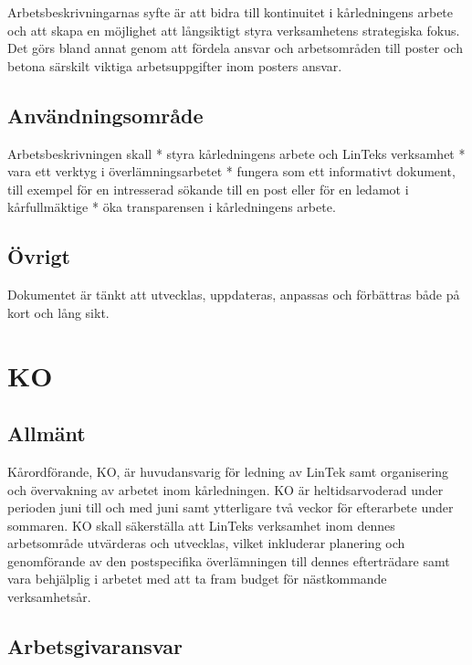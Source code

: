 Arbetsbeskrivningarnas syfte är att bidra till kontinuitet i
kårledningens arbete och att skapa en möjlighet att långsiktigt styra
verksamhetens strategiska fokus. Det görs bland annat genom att fördela
ansvar och arbetsområden till poster och betona särskilt viktiga
arbetsuppgifter inom posters ansvar.

\hypertarget{anvuxe4ndningsomruxe5de}{%
\subsection{Användningsområde}\label{anvuxe4ndningsomruxe5de}}

Arbetsbeskrivningen skall * styra kårledningens arbete och LinTeks
verksamhet * vara ett verktyg i överlämningsarbetet * fungera som ett
informativt dokument, till exempel för en intresserad sökande till en
post eller för en ledamot i kårfullmäktige * öka transparensen i
kårledningens arbete.

\hypertarget{uxf6vrigt}{%
\subsection{Övrigt}\label{uxf6vrigt}}

Dokumentet är tänkt att utvecklas, uppdateras, anpassas och förbättras
både på kort och lång sikt.

\hypertarget{ko}{%
\section{KO}\label{ko}}

\hypertarget{allmuxe4nt}{%
\subsection{Allmänt}\label{allmuxe4nt}}

Kårordförande, KO, är huvudansvarig för ledning av LinTek samt
organisering och övervakning av arbetet inom kårledningen. KO är
heltidsarvoderad under perioden juni till och med juni samt ytterligare
två veckor för efterarbete under sommaren. KO skall säkerställa att
LinTeks verksamhet inom dennes arbetsområde utvärderas och utvecklas,
vilket inkluderar planering och genomförande av den postspecifika
överlämningen till dennes efterträdare samt vara behjälplig i arbetet
med att ta fram budget för nästkommande verksamhetsår.

\hypertarget{arbetsgivaransvar}{%
\subsection{Arbetsgivaransvar}\label{arbetsgivaransvar}}


